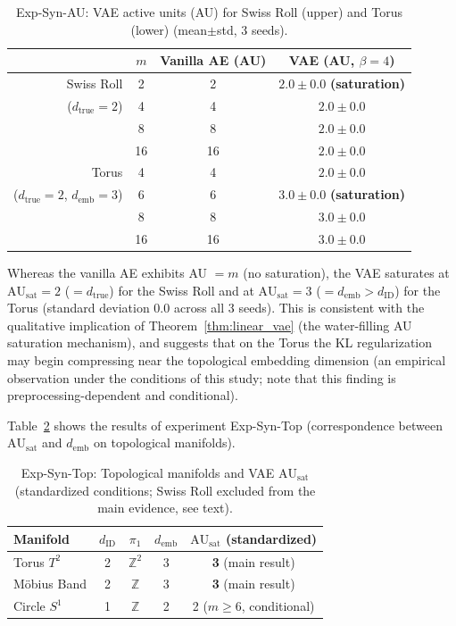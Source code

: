 \documentclass[make,article,submit,pdftex,moreauthors]{Definitions/mdpi}
\newcommand{\dID}{d_{\mathrm{ID}}}
\newcommand{\dtrue}{d_{\mathrm{true}}}
\newcommand{\AUsat}{\mathrm{AU}_{\mathrm{sat}}}
\newcommand{\demb}{d_{\mathrm{emb}}}
\begin{document}
\begin{table}[H]
\centering
\caption{Exp-Syn-AU: VAE active units (AU) for Swiss Roll (upper) and Torus (lower) (mean$\pm$std, 3 seeds).}
\label{tab:ea_summary}
\small
\begin{tabular}{rccc}
\toprule
 & $m$ & Vanilla AE (AU) & VAE (AU, $\beta=4$) \\
\midrule
Swiss Roll & 2 & 2 & $2.0\pm0.0$ \textbf{(saturation)} \\
($d_\mathrm{true}=2$) & 4 & 4 & $2.0\pm0.0$ \\
 & 8 & 8 & $2.0\pm0.0$ \\
 & 16 & 16 & $2.0\pm0.0$ \\
\midrule
Torus & 4 & 4 & $2.0\pm0.0$ \\
($d_\mathrm{true}=2$, $d_\mathrm{emb}=3$) & 6 & 6 & $3.0\pm0.0$ \textbf{(saturation)} \\
 & 8 & 8 & $3.0\pm0.0$ \\
 & 16 & 16 & $3.0\pm0.0$ \\
\bottomrule
\end{tabular}
\end{table}

Whereas the vanilla AE exhibits AU $= m$ (no saturation),
the VAE saturates at $\AUsat = 2$ ($= \dtrue$) for the Swiss Roll
and at $\AUsat = 3$ ($= \demb > \dID$) for the Torus (standard deviation 0.0 across all 3 seeds).
This is consistent with the qualitative implication of Theorem~\ref{thm:linear_vae}
(the water-filling AU saturation mechanism),
and suggests that on the Torus the KL regularization may begin compressing near the topological embedding dimension
(an empirical observation under the conditions of this study; note that this finding is preprocessing-dependent and conditional).

Table~\ref{tab:eb_summary} shows the results of experiment Exp-Syn-Top
(correspondence between $\AUsat$ and $\demb$ on topological manifolds).

\begin{table}[H]
\centering
\caption{Exp-Syn-Top: Topological manifolds and VAE $\AUsat$ (standardized conditions; Swiss Roll excluded from the main evidence, see text).}
\label{tab:eb_summary}
\small
\begin{tabular}{lcccc}
\toprule
Manifold & $\dID$ & $\pi_1$ & $\demb$ & $\AUsat$ (standardized) \\
\midrule
Torus $T^2$  & 2 & $\mathbb{Z}^2$ & 3 & \textbf{3} (main result) \\
M\"obius Band  & 2 & $\mathbb{Z}$   & 3 & \textbf{3} (main result) \\
Circle $S^1$ & 1 & $\mathbb{Z}$   & 2 & 2 ($m \geq 6$, conditional) \\
\bottomrule
\end{tabular}
\end{table}
\end{document}
